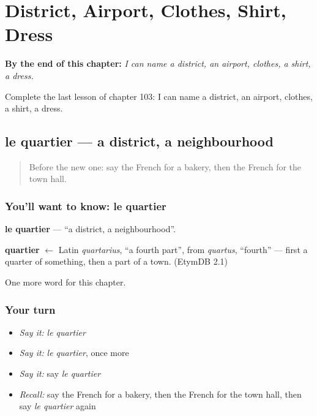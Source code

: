 
\chapter{District, Airport, Clothes, Shirt, Dress}
\label{ch:fr-district-airport-clothes-shirt-dress}

\begin{chapteropening}
\textbf{By the end of this chapter:} \emph{I can name a district, an airport, clothes, a shirt, a dress.}

Complete the last lesson of chapter 103: I can name a district, an airport, clothes, a shirt, a dress.
\end{chapteropening}

\section[le quartier]{le quartier — a district, a neighbourhood}

\label{lesson:FR-C103-quartier}



\begin{quote}
Before the new one: say the French for a bakery, then the French for the town hall.
\end{quote}

\subsection*{You'll want to know: le quartier}
\textbf{le quartier} — \textquotedblleft{}a district, a neighbourhood\textquotedblright{}.

\begin{cousinweb}
\textbf{quartier} $\leftarrow$ Latin \emph{quartarius}, \textquotedblleft{}a fourth part\textquotedblright{}, from \emph{quartus}, \textquotedblleft{}fourth\textquotedblright{} — first a quarter of something, then a part of a town. (EtymDB 2.1)
\end{cousinweb}

\begin{grammarlens}[title={What you've built}]
One more word for this chapter.
\end{grammarlens}

\subsection*{Your turn}
\begin{itemize}
\raggedright
  \item \emph{Say it:} \emph{le quartier}
  \item \emph{Say it:} \emph{le quartier}, once more
  \item \emph{Say it:} say \emph{le quartier}
  \item \emph{Recall:} say the French for a bakery, then the French for the town hall, then say \emph{le quartier} again
\end{itemize}

